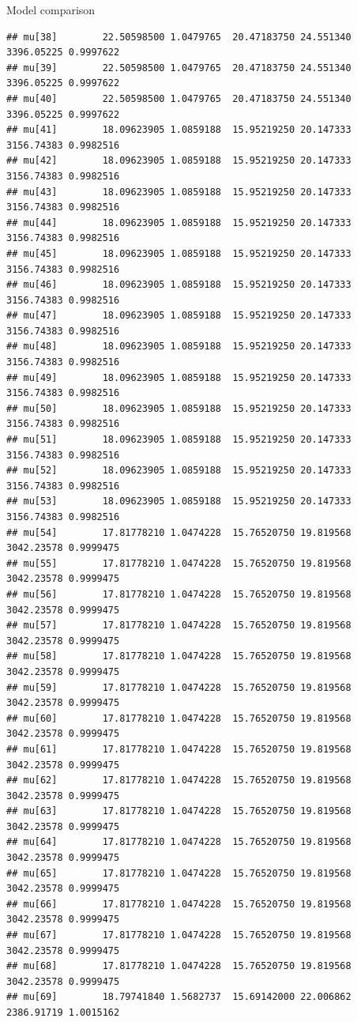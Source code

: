 \documentclass[
  ignorenonframetext,
]{beamer}
\begin{document}
\begin{frame}[fragile]{Model comparison}
\begin{verbatim}
## mu[38]        22.50598500 1.0479765  20.47183750 24.551340 3396.05225 0.9997622
## mu[39]        22.50598500 1.0479765  20.47183750 24.551340 3396.05225 0.9997622
## mu[40]        22.50598500 1.0479765  20.47183750 24.551340 3396.05225 0.9997622
## mu[41]        18.09623905 1.0859188  15.95219250 20.147333 3156.74383 0.9982516
## mu[42]        18.09623905 1.0859188  15.95219250 20.147333 3156.74383 0.9982516
## mu[43]        18.09623905 1.0859188  15.95219250 20.147333 3156.74383 0.9982516
## mu[44]        18.09623905 1.0859188  15.95219250 20.147333 3156.74383 0.9982516
## mu[45]        18.09623905 1.0859188  15.95219250 20.147333 3156.74383 0.9982516
## mu[46]        18.09623905 1.0859188  15.95219250 20.147333 3156.74383 0.9982516
## mu[47]        18.09623905 1.0859188  15.95219250 20.147333 3156.74383 0.9982516
## mu[48]        18.09623905 1.0859188  15.95219250 20.147333 3156.74383 0.9982516
## mu[49]        18.09623905 1.0859188  15.95219250 20.147333 3156.74383 0.9982516
## mu[50]        18.09623905 1.0859188  15.95219250 20.147333 3156.74383 0.9982516
## mu[51]        18.09623905 1.0859188  15.95219250 20.147333 3156.74383 0.9982516
## mu[52]        18.09623905 1.0859188  15.95219250 20.147333 3156.74383 0.9982516
## mu[53]        18.09623905 1.0859188  15.95219250 20.147333 3156.74383 0.9982516
## mu[54]        17.81778210 1.0474228  15.76520750 19.819568 3042.23578 0.9999475
## mu[55]        17.81778210 1.0474228  15.76520750 19.819568 3042.23578 0.9999475
## mu[56]        17.81778210 1.0474228  15.76520750 19.819568 3042.23578 0.9999475
## mu[57]        17.81778210 1.0474228  15.76520750 19.819568 3042.23578 0.9999475
## mu[58]        17.81778210 1.0474228  15.76520750 19.819568 3042.23578 0.9999475
## mu[59]        17.81778210 1.0474228  15.76520750 19.819568 3042.23578 0.9999475
## mu[60]        17.81778210 1.0474228  15.76520750 19.819568 3042.23578 0.9999475
## mu[61]        17.81778210 1.0474228  15.76520750 19.819568 3042.23578 0.9999475
## mu[62]        17.81778210 1.0474228  15.76520750 19.819568 3042.23578 0.9999475
## mu[63]        17.81778210 1.0474228  15.76520750 19.819568 3042.23578 0.9999475
## mu[64]        17.81778210 1.0474228  15.76520750 19.819568 3042.23578 0.9999475
## mu[65]        17.81778210 1.0474228  15.76520750 19.819568 3042.23578 0.9999475
## mu[66]        17.81778210 1.0474228  15.76520750 19.819568 3042.23578 0.9999475
## mu[67]        17.81778210 1.0474228  15.76520750 19.819568 3042.23578 0.9999475
## mu[68]        17.81778210 1.0474228  15.76520750 19.819568 3042.23578 0.9999475
## mu[69]        18.79741840 1.5682737  15.69142000 22.006862 2386.91719 1.0015162

\end{verbatim}
\end{frame}
\end{document}
